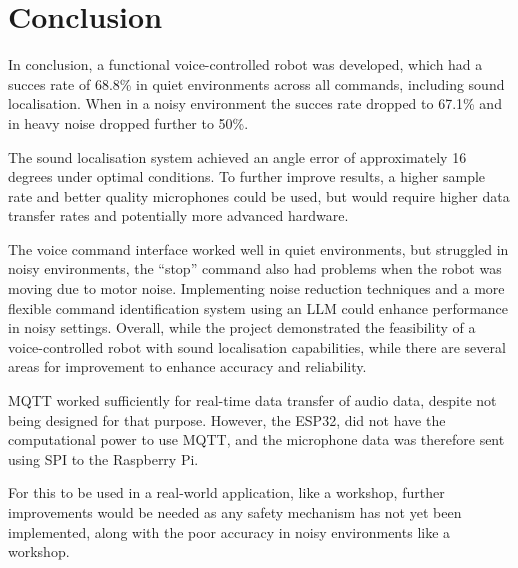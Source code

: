 \section{Conclusion}
In conclusion, a functional voice-controlled robot was developed, which had a succes rate of 68.8\% in quiet environments across all commands, including sound localisation. When in a noisy environment the succes rate dropped to 67.1\% and in heavy noise dropped further to 50\%. 

The sound localisation system achieved an angle error of approximately 16 degrees under optimal conditions. To further improve results, a higher sample rate and better quality microphones could be used, but would require higher data transfer rates and potentially more advanced hardware. 

The voice command interface worked well in quiet environments, but struggled in noisy environments, the ``stop'' command also had problems when the robot was moving due to motor noise. Implementing noise reduction techniques and a more flexible command identification system using an LLM could enhance performance in noisy settings. Overall, while the project demonstrated the feasibility of a voice-controlled robot with sound localisation capabilities, while there are several areas for improvement to enhance accuracy and reliability.

MQTT worked sufficiently for real-time data transfer of audio data, despite not being designed for that purpose. However, the ESP32, did not have the computational power to use MQTT, and the microphone data was therefore sent using SPI to the Raspberry Pi. 

For this to be used in a real-world application, like a workshop, further improvements would be needed as any safety mechanism has not yet been implemented, along with the poor accuracy in noisy environments like a workshop.